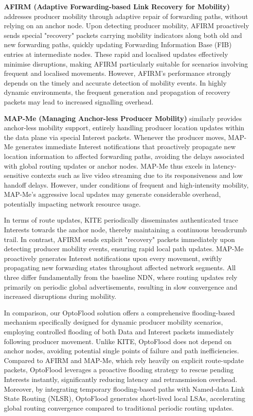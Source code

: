 \documentclass[conference]{IEEEtran}
\begin{document}
\textbf{AFIRM (Adaptive Forwarding-based Link Recovery for Mobility)} \cite{AFIRM} addresses producer mobility through adaptive repair of forwarding paths, without relying on an anchor node. Upon detecting producer mobility, AFIRM proactively sends special "recovery" packets carrying mobility indicators along both old and new forwarding paths, quickly updating Forwarding Information Base (FIB) entries at intermediate nodes. These rapid and localised updates effectively minimise disruptions, making AFIRM particularly suitable for scenarios involving frequent and localised movements. However, AFIRM's performance strongly depends on the timely and accurate detection of mobility events. In highly dynamic environments, the frequent generation and propagation of recovery packets may lead to increased signalling overhead.

\textbf{MAP-Me (Managing Anchor-less Producer Mobility)} \cite{MAPME} similarly provides anchor-less mobility support, entirely handling producer location updates within the data plane via special Interest packets. Whenever the producer moves, MAP-Me generates immediate Interest notifications that proactively propagate new location information to affected forwarding paths, avoiding the delays associated with global routing updates or anchor nodes. MAP-Me thus excels in latency-sensitive contexts such as live video streaming due to its responsiveness and low handoff delays. However, under conditions of frequent and high-intensity mobility, MAP-Me's aggressive local updates may generate considerable overhead, potentially impacting network resource usage.

In terms of route updates, KITE periodically disseminates authenticated trace Interests towards the anchor node, thereby maintaining a continuous breadcrumb trail. In contrast, AFIRM sends explicit "recovery" packets immediately upon detecting producer mobility events, ensuring rapid local path updates. MAP-Me proactively generates Interest notifications upon every movement, swiftly propagating new forwarding states throughout affected network segments. All three differ fundamentally from the baseline NDN, where routing updates rely primarily on periodic global advertisements, resulting in slow convergence and increased disruptions during mobility.

In comparison, our OptoFlood solution offers a comprehensive flooding-based mechanism specifically designed for dynamic producer mobility scenarios, employing controlled flooding of both Data and Interest packets immediately following producer movement. Unlike KITE, OptoFlood does not depend on anchor nodes, avoiding potential single points of failure and path inefficiencies. Compared to AFIRM and MAP-Me, which rely heavily on explicit route-update packets, OptoFlood leverages a proactive flooding strategy to rescue pending Interests instantly, significantly reducing latency and retransmission overhead. Moreover, by integrating temporary flooding-based paths with Named-data Link State Routing (NLSR), OptoFlood generates short-lived local LSAs, accelerating global routing convergence compared to traditional periodic routing updates.
\end{document}
